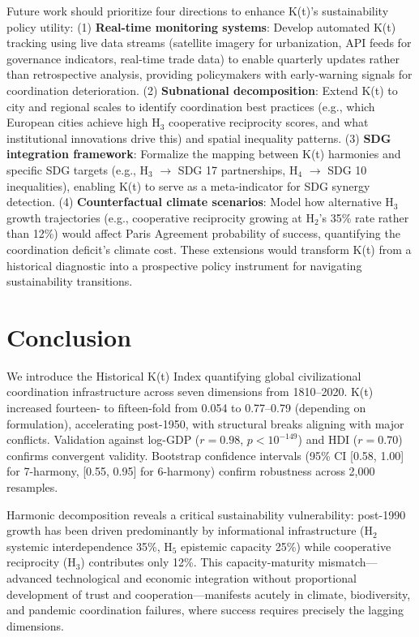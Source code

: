 \documentclass[11pt,letterpaper]{article}
\begin{document}
Future work should prioritize four directions to enhance K(t)'s sustainability policy utility: (1) \textbf{Real-time monitoring systems}: Develop automated K(t) tracking using live data streams (satellite imagery for urbanization, API feeds for governance indicators, real-time trade data) to enable quarterly updates rather than retrospective analysis, providing policymakers with early-warning signals for coordination deterioration. (2) \textbf{Subnational decomposition}: Extend K(t) to city and regional scales to identify coordination best practices (e.g., which European cities achieve high H$_3$ cooperative reciprocity scores, and what institutional innovations drive this) and spatial inequality patterns. (3) \textbf{SDG integration framework}: Formalize the mapping between K(t) harmonies and specific SDG targets (e.g., H$_3$ $\to$ SDG 17 partnerships, H$_4$ $\to$ SDG 10 inequalities), enabling K(t) to serve as a meta-indicator for SDG synergy detection. (4) \textbf{Counterfactual climate scenarios}: Model how alternative H$_3$ growth trajectories (e.g., cooperative reciprocity growing at H$_2$'s 35\% rate rather than 12\%) would affect Paris Agreement probability of success, quantifying the coordination deficit's climate cost. These extensions would transform K(t) from a historical diagnostic into a prospective policy instrument for navigating sustainability transitions.

\section{Conclusion}
\label{sec:conclusion}

We introduce the Historical K(t) Index quantifying global civilizational coordination infrastructure across seven dimensions from 1810--2020. K(t) increased fourteen- to fifteen-fold from 0.054 to 0.77--0.79 (depending on formulation), accelerating post-1950, with structural breaks aligning with major conflicts. Validation against log-GDP ($r=0.98$, $p<10^{-149}$) and HDI ($r=0.70$) confirms convergent validity. Bootstrap confidence intervals (95\% CI [0.58, 1.00] for 7-harmony, [0.55, 0.95] for 6-harmony) confirm robustness across 2,000 resamples.

Harmonic decomposition reveals a critical sustainability vulnerability: post-1990 growth has been driven predominantly by informational infrastructure (H$_2$ systemic interdependence 35\%, H$_5$ epistemic capacity 25\%) while cooperative reciprocity (H$_3$) contributes only 12\%. This capacity-maturity mismatch---advanced technological and economic integration without proportional development of trust and cooperation---manifests acutely in climate, biodiversity, and pandemic coordination failures, where success requires precisely the lagging dimensions.
\end{document}
